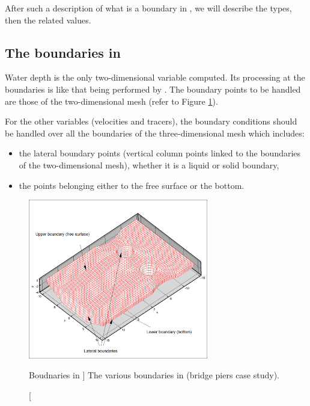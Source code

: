 After such a description of what is a boundary in , we will describe
the types, then the related values.

\subsection{The boundaries in }

Water depth is the only two-dimensional variable computed. Its processing at
the boundaries is like that being performed by . The boundary points
to be handled are those of the two-dimensional mesh (refer to Figure
\ref{fig:bnd}).

For the other variables (velocities and tracers), the boundary conditions
should be handled over all the boundaries of the three-dimensional mesh which
includes:

\begin{itemize}
\item the lateral boundary points (vertical column points linked to the
boundaries of the two-dimensional mesh), whether it is a liquid or solid
boundary,

\item the points belonging either to the free surface or the bottom.
\end{itemize}

\begin{figure}[H]%
\begin{center}
%
  \includegraphics[width=0.7\textwidth]{./graphics/bnd}
%
\end{center}
\caption
[Boudnaries in ]
{The various boundaries in  (bridge piers case study).}
\label{fig:bnd}
\end{figure}

